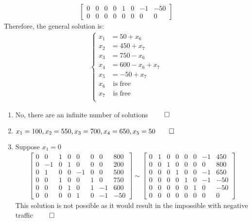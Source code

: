 \documentclass[12pt, a4paper]{article}
\begin{document}
\begin{enumerate}[Q\arabic*.]
\begin{align*}
\begin{bmatrix}
        0 & 0 & 0 & 0 & 1 & 0 & -1 & -50 \\
        0 & 0 & 0 & 0 & 0 & 0 & 0 & 0
      \end{bmatrix}
    \end{align*}
    Therefore, the general solution is:
    \begin{align*}
      \begin{cases}
        x_1 &= 50 + x_6 \\
        x_2 &= 450 + x_7 \\
        x_3 &= 750 - x_6 \\
        x_4 &= 600 - x_6 + x_7 \\
        x_5 &= -50 + x_7 \\
        x_6 & \text{ is free} \\
        x_7 & \text{ is free} \\
      \end{cases}
    \end{align*}
    \begin{enumerate}[(\alph*)]
      \item No, there are an infinite number of solutions $\qed$
      \item $x_1 = 100, x_2 = 550, x_3 = 700, x_4 = 650, x_5 = 50 \qed$
      \item Suppose $x_1 = 0$
      \begin{align*}
        \begin{bmatrix}
          0 & 0 & 1 & 0 & 0 & 0 & 0 & 800 \\
          0 & -1 & 0 & 1 & 0 & 0 & 0 & 200 \\
          0 & 1 & 0 & 0 & -1 & 0 & 0 & 500 \\
          0 & 0 & 1 & 0 & 0 & 1 & 0 & 750 \\
          0 & 0 & 0 & 1 & 0 & 1 & -1 & 600 \\
          0 & 0 & 0 & 0 & 1 & 0 & -1 & -50
        \end{bmatrix} \sim
        \begin{bmatrix}
          0 & 1 & 0 & 0 & 0 & 0 & -1 & 450 \\
          0 & 0 & 1 & 0 & 0 & 0 & 0 & 800 \\
          0 & 0 & 0 & 1 & 0 & 0 & -1 & 650 \\
          0 & 0 & 0 & 0 & 1 & 0 & -1 & -50 \\
          0 & 0 & 0 & 0 & 0 & 1 & 0 & -50 \\
          0 & 0 & 0 & 0 & 0 & 0 & 0 & 0
        \end{bmatrix}
      \end{align*}
      This solution is not possible as it would result in the impossible with negative traffic $\qed$
    \end{enumerate}
\end{enumerate}
\end{document}

